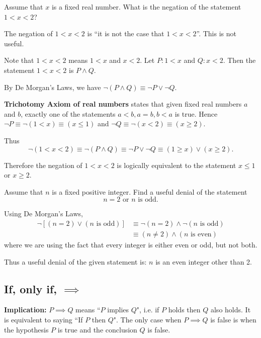\begin{exmp}{}{}
Assume that $x$ is a fixed real number. What is the negation of the statement $1<x<2$?
\end{exmp}
\begin{solution}
The negation of $1<x<2$ is ``it is not the case that $1<x<2$”. This is not useful.

Note that $1<x<2$ means $1<x$ and $x<2$. Let $P:1<x$ and $Q:x<2$. Then the statement $1<x<2$ is $P \land Q$.

By De Morgan's Laws, we have $\lnot (P \land Q) \equiv \lnot P \lor \lnot Q$.

\textbf{Trichotomy Axiom of real numbers} states that given fixed real numbers $a$ and $b$, exactly one of the statements $a<b, a=b, b<a$ is true. Hence $\lnot P \equiv \lnot (1<x) \equiv (x \le 1)$ and $\lnot Q \equiv \lnot (x<2) \equiv (x \ge 2)$.

Thus
\[ \lnot (1<x<2) \equiv \lnot (P \land Q) \equiv \lnot P \lor \lnot Q \equiv (1 \ge x) \lor (x \ge 2). \]

Therefore the negation of $1<x<2$ is logically equivalent to the statement $x \le 1$ or $x \ge 2$.
\end{solution}

\begin{exmp}{}{}
Assume that $n$ is a fixed positive integer. Find a useful denial of the statement
\[ n = 2 \text{ or } n \text{ is odd.} \]
\end{exmp}
\begin{solution}
Using De Morgan's Laws,
\begin{align*}
\lnot [(n = 2) \lor (n \text{ is odd})] &\equiv \lnot(n = 2) \land \lnot(n \text{ is odd}) \\
&\equiv (n \neq 2) \land (n \text{ is even})
\end{align*}
where we are using the fact that every integer is either even or odd, but not both.

Thus a useful denial of the given statement is: $n$ is an even integer other than 2.
\end{solution}
\pagebreak

\subsection{If, only if, $\implies$}
\textbf{Implication:} $P \implies Q$ means ``$P$ implies $Q$", i.e. if $P$ holds then $Q$ also holds. It is equivalent to saying ``If $P$ then $Q$". The only case when $P \implies Q$ is false is when the hypothesis $P$ is true and the conclusion $Q$ is false.

